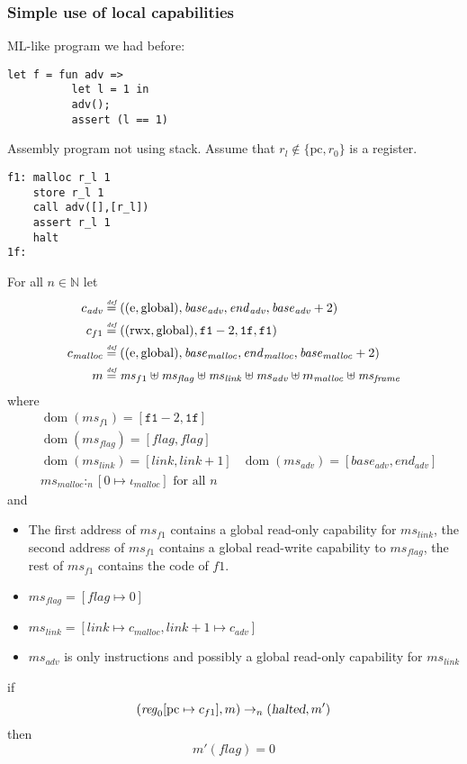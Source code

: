 \documentclass[a4paper]{article}
\newcommand{\update}[2]{[#1 \mapsto #2]}
\newcommand{\defeq}{\stackrel{\textit{\tiny{def}}}{=}}
\DeclareMathOperator{\dom}{dom}
\newcommand{\var}[1]{\mathit{#1}}
\newcommand{\hs}{\var{ms}}
\newcommand{\ms}{\hs}
\newcommand{\pcreg}{\mathrm{pc}}
\newcommand{\start}{\var{base}}
\newcommand{\addrend}{\var{end}}
\newcommand{\reg}{\var{reg}}
\newcommand{\heap}{\var{mem}}
\newcommand{\adv}{\var{adv}}
\newcommand{\link}{\var{link}}
\newcommand{\flag}{\var{flag}}
\newcommand{\halted}{\textsl{halted}}
\newcommand{\heapSat}[3][\heap]{#1 :_{#2} #3}
\newcommand{\codelabel}[1]{\mathit{#1}}
\newcommand{\malloc}{\codelabel{malloc}}
\newcommand{\nats}{\mathbb{N}}
\newcommand{\plainperm}[1]{\mathrm{#1}}
\newcommand{\entry}{\plainperm{e}}
\newcommand{\rwx}{\plainperm{rwx}}
\newcommand{\glob}{\plainperm{global}}
\newcommand{\step}[1][]{\rightarrow_{#1}}
\begin{document}
\subsubsection{Simple use of local capabilities}
ML-like program we had before:
\begin{verbatim}
let f = fun adv =>
          let l = 1 in
          adv();
          assert (l == 1)
\end{verbatim}
Assembly program not using stack. Assume that $r_l \not\in \{\pcreg,r_0 \}$ is a register.
\begin{verbatim}
f1: malloc r_l 1
    store r_l 1
    call adv([],[r_l])
    assert r_l 1
    halt
1f:
\end{verbatim}
\begin{lemma}
  For all $n \in \nats$
  let
  \begin{align*}
    c_{\var{adv}} & \defeq ((\entry,\glob),\start_{\adv},\addrend_{\adv},\start_{\adv}+2) \\
    c_{f1} & \defeq ((\rwx,\glob),\mathtt{f1}-2,\mathtt{1f},\mathtt{f1}) \\
    c_\malloc & \defeq ((\entry,\glob),\start_\malloc,\addrend_\malloc,\start_\malloc+2) \\
    m & \defeq \hs_{f1} \uplus 
               \hs_\flag \uplus                
               \ms_{\var{link}} \uplus 
               \hs_\adv \uplus 
               m_{\malloc} \uplus 
               \hs_{\var{frame}} 
  \end{align*}
where 
\begin{align*}
  &\dom(\hs_{f1}) = [\mathtt{f1}-2,\mathtt{1f}] \\
  &\dom(\hs_\flag) = [\flag,\flag] \\
  &\dom(\ms_\link) = [\link,\link+1]
  &\dom(\hs_{\adv}) = [\start_\adv,\addrend_\adv] \\
  &\heapSat[\hs_{\malloc}]{n}{[0 \mapsto \iota_{\malloc}]} \text{ for all } n
\end{align*}
and
\begin{itemize}
\item The first address of $\hs_{f1}$ contains a global read-only capability for $\hs_\link$, the second address of $\hs_{f1}$ contains a global read-write capability to $\hs_{flag}$, the rest of $\hs_{f1}$ contains the code of $f1$.
\item $\ms_\flag = [flag \mapsto 0]$
\item $\ms_{\var{link}} = [\var{link} \mapsto c_\malloc, \var{link} + 1 \mapsto c_\adv]$
\item $\hs_\adv$ is only instructions and possibly a global read-only capability for $\hs_\link$
\end{itemize}
if 
  \[
    (\reg_0\update{\pcreg}{c_{f1}},m) \step[n] (\halted,m')
  \]
then
\[
  m'(\flag) = 0
\]  
\end{lemma}
\end{document}
